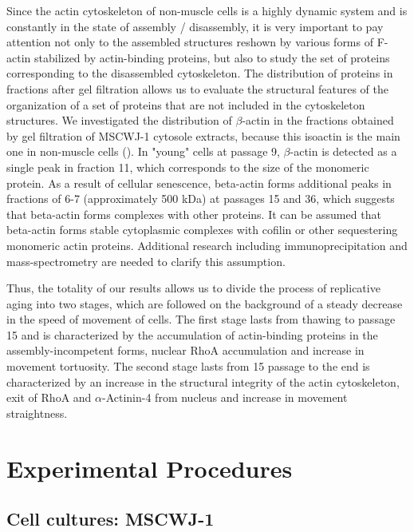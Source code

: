 \documentclass[alpha-refs]{wiley-article}
\begin{document}
Since the actin cytoskeleton of non-muscle cells is a highly dynamic system and is constantly in the state of assembly / disassembly, it is very important to pay attention not only to the assembled structures reshown by various forms of F-actin stabilized by actin-binding proteins, but also to study the set of proteins corresponding to the disassembled cytoskeleton.
The distribution of proteins in fractions after gel filtration allows us to evaluate the structural features of the organization of a set of proteins that are not included in the cytoskeleton structures.
We investigated the distribution of $\beta$-actin in the fractions obtained by gel filtration of MSCWJ-1 cytosole extracts, because this isoactin is the main one in non-muscle cells (\cite{khaitlina2001functional}).
In "young" cells at passage 9, $\beta$-actin is detected as a single peak in fraction 11, which corresponds to the size of the monomeric protein.
As a result of cellular senescence, beta-actin forms additional peaks in fractions of 6-7 (approximately 500 kDa) at passages 15 and 36, which suggests that beta-actin forms complexes with other proteins.
It can be assumed that beta-actin forms stable cytoplasmic complexes with cofilin or other sequestering monomeric actin proteins.
Additional research including immunoprecipitation and mass-spectrometry are needed to clarify this assumption.

Thus, the totality of our results allows us to divide the process of replicative aging into two stages, which are followed on the background of a steady decrease in the speed of movement of cells.
The first stage lasts from thawing to passage 15 and is characterized by the accumulation of actin-binding proteins in the assembly-incompetent forms, nuclear RhoA accumulation and increase in movement tortuosity.
The second stage lasts from 15 passage to the end is characterized by an increase in the structural integrity of the actin cytoskeleton, exit of RhoA and $\alpha$-Actinin-4 from nucleus and increase in movement straightness.

\section{Experimental Procedures}

\subsection{Cell cultures: MSCWJ-1}
\end{document}
